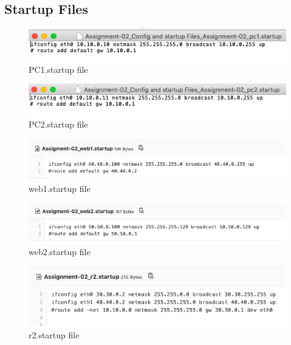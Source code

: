 \subsection{Startup Files}
\begin{figure}[H]
\centering
  \includegraphics[width=400pt]{Images/PC1.startup.png}
  \caption{PC1.startup file}
  \label{fig:3.2}
\end{figure}
\begin{figure}[H]
\centering
  \includegraphics[width=400pt]{Images/pc2.startup.png}
  \caption{PC2.startup file}
  \label{fig:3.2}
\end{figure}
\begin{figure}[H]
\centering
  \includegraphics[width=400pt]{Images/web1.startup.png}
  \caption{web1.startup file}
  \label{fig:3.2}
\end{figure}
\begin{figure}[H]
\centering
  \includegraphics[width=400pt]{Images/web2.startup.png}
  \caption{web2.startup file}
  \label{fig:3.2}
\end{figure}
\begin{figure}[H]
\centering
  \includegraphics[width=400pt]{Images/r2.startup.png}
  \caption{r2.startup file}
  \label{fig:3.2}
\end{figure}
